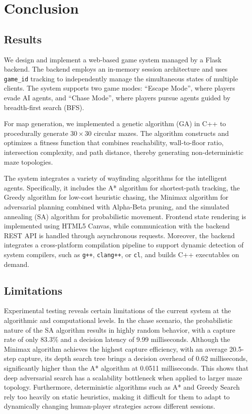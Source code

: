 \documentclass[12pt,a4paper]{article}
\begin{document}
\section{Conclusion}

\subsection{Results}

We design and implement a web-based game system managed by a Flask backend. The backend employs an in-memory session architecture and uses \texttt{game\_id} tracking to independently manage the simultaneous states of multiple clients. The system supports two game modes: ``Escape Mode'', where players evade AI agents, and ``Chase Mode'', where players pursue agents guided by breadth-first search (BFS).

For map generation, we implemented a genetic algorithm (GA) in C++ to procedurally generate $30\times30$ circular mazes. The algorithm constructs and optimizes a fitness function that combines reachability, wall-to-floor ratio, intersection complexity, and path distance, thereby generating non-deterministic maze topologies.

The system integrates a variety of wayfinding algorithms for the intelligent agents. Specifically, it includes the A* algorithm for shortest-path tracking, the Greedy algorithm for low-cost heuristic chasing, the Minimax algorithm for adversarial planning combined with Alpha-Beta pruning, and the simulated annealing (SA) algorithm for probabilistic movement. Frontend state rendering is implemented using HTML5 Canvas, while communication with the backend REST API is handled through asynchronous requests. Moreover, the backend integrates a cross-platform compilation pipeline to support dynamic detection of system compilers, such as \texttt{g++}, \texttt{clang++}, or \texttt{cl}, and builds C++ executables on demand.

\subsection{Limitations}

Experimental testing reveals certain limitations of the current system at the algorithmic and computational levels. In the chase scenario, the probabilistic nature of the SA algorithm results in highly random behavior, with a capture rate of only 83.3\% and a decision latency of 9.99 milliseconds. Although the Minimax algorithm achieves the highest capture efficiency, with an average 20.5-step capture, its depth search tree brings a decision overhead of 0.62 milliseconds, significantly higher than the A* algorithm at 0.0511 milliseconds. This shows that deep adversarial search has a scalability bottleneck when applied to larger maze topology. Furthermore, deterministic algorithms such as A* and Greedy Search rely too heavily on static heuristics, making it difficult for them to adapt to dynamically changing human-player strategies across different sessions.
\end{document}

